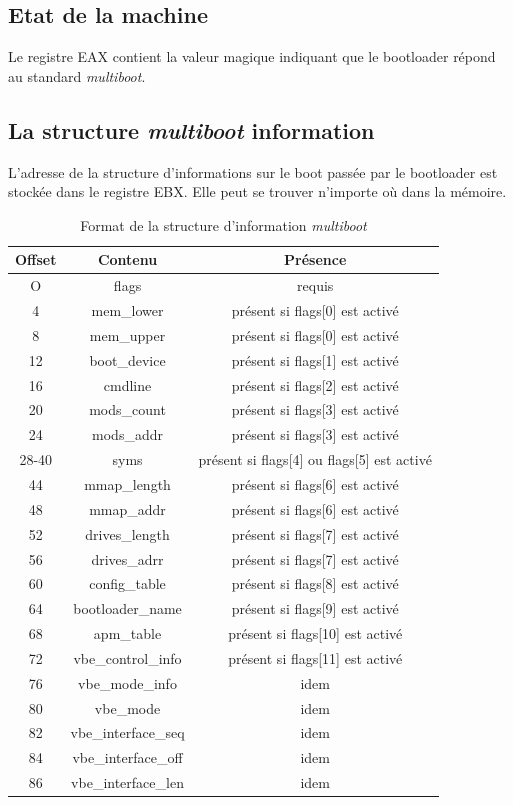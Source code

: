 \documentclass{article}
\begin{document}
\subsection{Etat de la machine }
  Le registre EAX contient la valeur magique indiquant que le bootloader répond au standard \emph{multiboot}.
\subsection{La structure \emph{multiboot} information}
L'adresse de la structure d'informations sur le boot passée par le bootloader est stockée dans le registre EBX. Elle peut se trouver n'importe où dans la mémoire.
\begin{table}[h]
\begin{center}
\begin{tabular}{|c|c|c|}
\hline Offset & Contenu & Présence \\ 
\hline  O &  flags &  requis \\ 
\hline   4 & mem\_lower &  présent si flags[0] est activé \\ 
\hline  8 & mem\_upper &  présent si flags[0] est activé\\ 
\hline  12 & boot\_device & présent si flags[1] est activé \\ 
\hline  16 & cmdline & présent si flags[2] est activé \\ 
\hline  20 & mods\_count &  présent si flags[3] est activé\\ 
\hline  24 & mods\_addr &  présent si flags[3] est activé\\ 
\hline  28-40 & syms &  présent si flags[4] ou flags[5] est activé\\ 
\hline  44 & mmap\_length &  présent si flags[6] est activé\\ 
\hline  48 & mmap\_addr &  présent si flags[6] est activé\\ 
\hline  52 & drives\_length &  présent si flags[7] est activé\\ 
\hline  56 & drives\_adrr &  présent si flags[7] est activé\\ 
\hline  60 & config\_table &  présent si flags[8] est activé\\ 
\hline  64 & bootloader\_name &  présent si flags[9] est activé\\ 
\hline  68 & apm\_table &  présent si flags[10] est activé\\ 
\hline  72 & vbe\_control\_info &  présent si flags[11] est activé\\ 
\hline  76 & vbe\_mode\_info &  idem\\ 
\hline  80 & vbe\_mode &  idem\\ 
\hline  82 & vbe\_interface\_seq &  idem\\ 
\hline  84 & vbe\_interface\_off &  idem\\ 
\hline  86 & vbe\_interface\_len &  idem\\ 
\hline 
\end{tabular} 
\end{center}
\caption{Format de la structure d'information \emph{multiboot}}
\label{Format de la structure d'information multiboot}
\end{table}
\end{document}
